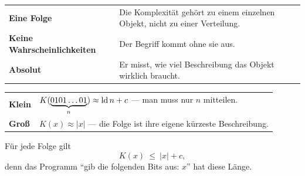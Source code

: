 \begin{merksatz}
\begin{center}
{\small
\renewcommand{\arraystretch}{1.5}
\begin{tabular}{@{}P{2.4cm}P{6.2cm}@{}}
\toprule
\textbf{Eine Folge} & Die Komplexität gehört zu einem einzelnen Objekt, nicht zu einer Verteilung.\\
\textbf{Keine Wahrscheinlichkeiten} & Der Begriff kommt ohne sie aus.\\
\textbf{Absolut} & Er misst, wie viel Beschreibung das Objekt wirklich braucht.\\
\bottomrule
\end{tabular}}
\end{center}

\begin{center}
\renewcommand{\arraystretch}{1.5}
\begin{tabular}{@{}P{2.4cm}P{6.2cm}@{}}
\toprule
\textbf{Klein} & $K(\underbrace{0101\ldots01}_{n}) \approx \operatorname{ld} n + c$ --- man muss nur $n$ mitteilen.\\
\textbf{Groß} & $K(x) \approx |x|$ --- die Folge ist ihre eigene kürzeste Beschreibung.\\
\bottomrule
\end{tabular}
\end{center}

Für jede Folge gilt
\[ K(x) \ \le\ |x| + c , \]
denn das Programm \enquote{gib die folgenden Bits aus: $x$} hat diese Länge.

\begin{center}
\begin{minipage}{0.88\textwidth}
\end{minipage}
\end{center}
\end{merksatz}

